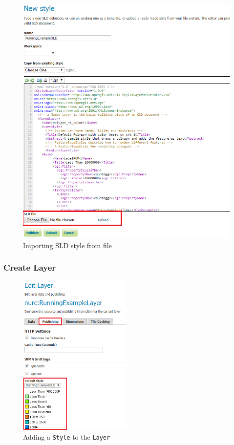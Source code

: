 \begin{figure}[t]
	\centering
	\includegraphics[scale=0.5]{Figures/NewStyleImport.png}
	\caption{\label{fig:styleimport}Importing SLD style from file}
\end{figure}

\subsubsection{Create Layer}

\begin{figure}[t]
\centering
\includegraphics[width=0.5\textwidth]{Figures/EditLayer_Publishing.png}
\caption{Adding a \lstinline|Style| to the \lstinline|Layer|
\label{fig:layerpublish}}
\end{figure}

